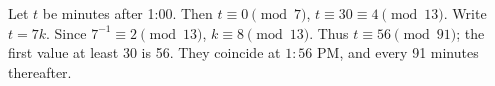 Let $t$ be minutes after 1:00. Then $t\equiv0\pmod7$, $t\equiv30\equiv4\pmod{13}$. Write $t=7k$. Since $7^{-1}\equiv2\pmod{13}$, $k\equiv8\pmod{13}$. Thus $t\equiv56\pmod{91}$; the first value at least 30 is 56. They coincide at $\boxed{1{:}56\text{ PM}}$, and every 91 minutes thereafter.
